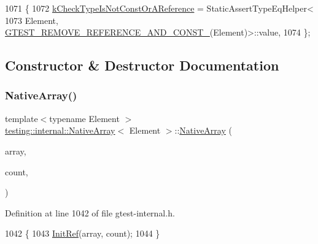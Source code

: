\begin{DoxyCode}
1071        \{
1072     \hyperlink{classtesting_1_1internal_1_1NativeArray_a14c66e9a884d371ac83e4fb9eb55148ea3be52e24b6c1558a819baf99922f9296}{kCheckTypeIsNotConstOrAReference} = StaticAssertTypeEqHelper<
1073         Element, \hyperlink{gtest-internal_8h_a874567b176266188fabfffb8393267ce}{GTEST\_REMOVE\_REFERENCE\_AND\_CONST\_}(Element)>::value,
1074   \};
\end{DoxyCode}


\subsection{Constructor \& Destructor Documentation}
\mbox{\label{classtesting_1_1internal_1_1NativeArray_a52b3689c62532703d11e9d82939a7141}} 
\subsubsection{\texorpdfstring{Native\+Array()}{NativeArray()}\hspace{0.1cm}{\footnotesize\ttfamily [1/3]}}
{\footnotesize\ttfamily template$<$typename Element $>$ \\
\hyperlink{classtesting_1_1internal_1_1NativeArray}{testing\+::internal\+::\+Native\+Array}$<$ Element $>$\+::\hyperlink{classtesting_1_1internal_1_1NativeArray}{Native\+Array} (\begin{DoxyParamCaption}\item[{const Element $\ast$}]{array,  }\item[{size\+\_\+t}]{count,  }\item[{\hyperlink{structtesting_1_1internal_1_1RelationToSourceReference}{Relation\+To\+Source\+Reference}}]{ }\end{DoxyParamCaption})\hspace{0.3cm}{\ttfamily [inline]}}



Definition at line 1042 of file gtest-\/internal.\+h.


\begin{DoxyCode}
1042                                                                              \{
1043     \hyperlink{classtesting_1_1internal_1_1NativeArray_ac6ad6d79e17e2c98a9d4d684afcb7f79}{InitRef}(array, count);
1044   \}
\end{DoxyCode}
\mbox{\label{classtesting_1_1internal_1_1NativeArray_ac184ee5741af5be3402213819c834405}} 
